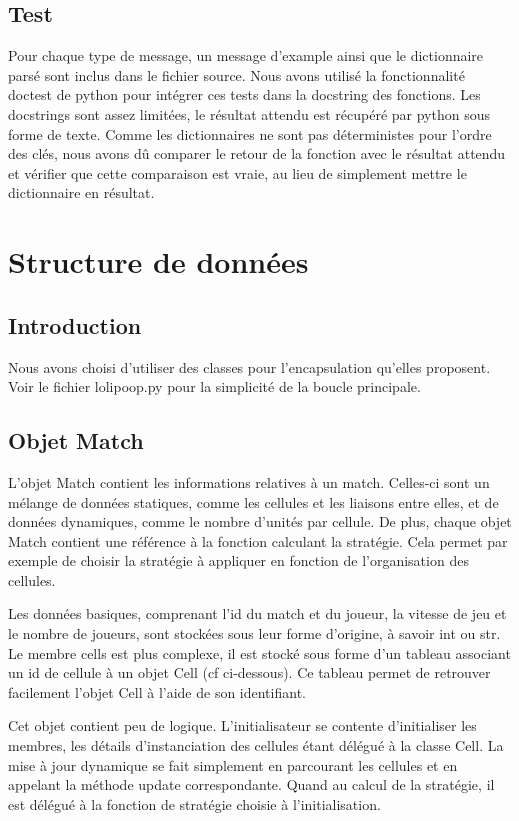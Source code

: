 \documentclass{rapport}
\begin{document}
			\subsection{Test}
Pour chaque type de message, un message d'example ainsi que le dictionnaire
parsé sont inclus dans le fichier source. Nous avons utilisé la fonctionnalité
doctest de python pour intégrer ces tests dans la docstring des fonctions. Les
docstrings sont assez limitées, le résultat attendu est récupéré par python sous
forme de texte. Comme les dictionnaires ne sont pas déterministes pour l'ordre
des clés, nous avons dû comparer le retour de la fonction avec le résultat
attendu et vérifier que cette comparaison est vraie, au lieu de simplement
mettre le dictionnaire en résultat.

		\section{Structure de données}
			\subsection{Introduction}
Nous avons choisi d'utiliser des classes pour l'encapsulation qu'elles
proposent. Voir le fichier lolipoop.py pour la simplicité de la boucle
principale.
			\subsection{Objet Match}
L'objet Match contient les informations relatives à un match. Celles-ci sont un
mélange de données statiques, comme les cellules et les liaisons entre elles, et
de données dynamiques, comme le nombre d'unités par cellule. De plus, chaque
objet Match contient une référence à la fonction calculant la stratégie. Cela
permet par exemple de choisir la stratégie à appliquer en fonction de
l'organisation des cellules.

Les données basiques, comprenant l'id du match et du joueur, la vitesse de jeu
et le nombre de joueurs, sont stockées sous leur forme d'origine, à savoir int
ou str. Le membre cells est plus complexe, il est stocké sous forme d'un tableau
associant un id de cellule à un objet Cell (cf ci-dessous). Ce tableau
permet de retrouver facilement l'objet Cell à l'aide de son identifiant.

Cet objet contient peu de logique. L'initialisateur se contente d'initialiser
les membres, les détails d'instanciation des cellules étant délégué à la classe
Cell. La mise à jour dynamique se fait simplement en parcourant les cellules et
en appelant la méthode update correspondante. Quand au calcul de la stratégie,
il est délégué à la fonction de stratégie choisie à l'initialisation.
\end{document}
